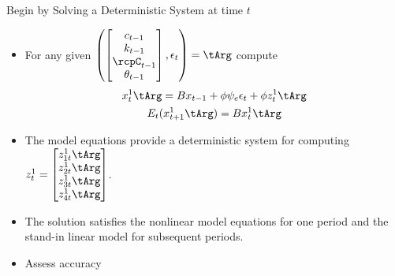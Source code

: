 \documentclass[12pt]{article}
\begin{document}
  {Begin by Solving a Deterministic System at time $t$}
{\small

  \begin{itemize}
  \item For any given $\left (  \begin{bmatrix}
c_{t-1}\\k_{t-1}\\ \rcpC_{t-1}\\\theta_{t-1}
  \end{bmatrix}, \epsilon_t \right )=\tArg$ 
compute
  \begin{gather}
    \label{eq:3}
    x_t^1\tArg=B x_{t-1} + \phi \psi_e\epsilon_t + \phi z^1_t\tArg\\
    E_t(x^1_{t+1}\tArg)=B x^1_{t}\tArg
  \end{gather}
\item The model equations provide a deterministic system  for computing $  z^1_t=\begin{bmatrix}
    z^1_{1t}\tArg\\
    z^1_{2t}\tArg\\
    z^1_{3t}\tArg\\
    z^1_{4t}\tArg
  \end{bmatrix}$.
\item The solution satisfies the nonlinear model equations for one 
period and the stand-in linear model for subsequent periods.
\item Assess accuracy
  \end{itemize}
}




\end{document}
